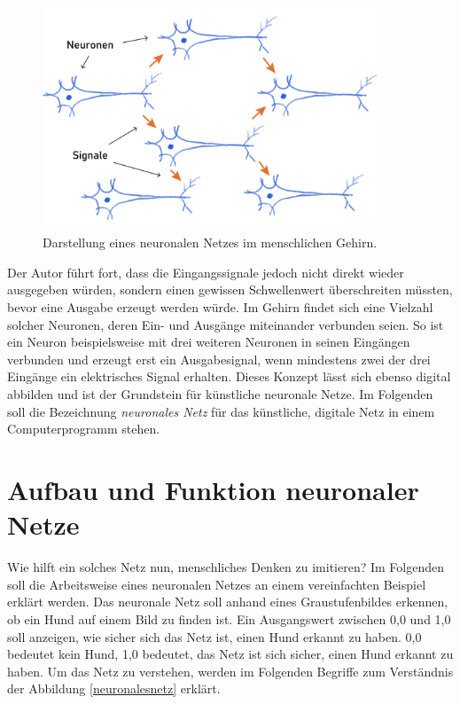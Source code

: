 \begin{figure}[ht]
    \centering
    \includegraphics[width=10cm]{bilder/NeuronenGehirn.jpg}
    \caption{Darstellung eines neuronalen Netzes im menschlichen Gehirn.}
    \label{neuronen2}
\end{figure}

 Der Autor führt fort, dass die Eingangssignale jedoch nicht direkt wieder ausgegeben würden, sondern einen gewissen Schwellenwert überschreiten müssten, bevor eine Ausgabe erzeugt werden würde. Im Gehirn findet sich eine Vielzahl solcher Neuronen, deren Ein- und Ausgänge miteinander verbunden seien. So ist ein Neuron beispielsweise mit drei weiteren Neuronen in seinen Eingängen verbunden und erzeugt erst ein Ausgabesignal, wenn mindestens zwei der drei Eingänge ein elektrisches Signal erhalten. Dieses Konzept lässt sich ebenso digital abbilden und ist der Grundstein für künstliche neuronale Netze. Im Folgenden soll die Bezeichnung \textit{neuronales Netz} für das künstliche, digitale Netz in einem Computerprogramm stehen.\\

\section{Aufbau und Funktion neuronaler Netze}

Wie hilft ein solches Netz nun, menschliches Denken zu imitieren? Im Folgenden soll die Arbeitsweise eines neuronalen Netzes an einem vereinfachten Beispiel erklärt werden. Das neuronale Netz soll anhand eines Graustufenbildes erkennen, ob ein Hund auf einem Bild zu finden ist. Ein Ausgangswert zwischen 0,0 und 1,0 soll anzeigen, wie sicher sich das Netz ist, einen Hund erkannt zu haben. 0,0 bedeutet kein Hund, 1,0 bedeutet, das Netz ist sich sicher, einen Hund erkannt zu haben. Um das Netz zu verstehen, werden im Folgenden Begriffe zum Verständnis der Abbildung \ref{neuronalesnetz} erklärt.\\

